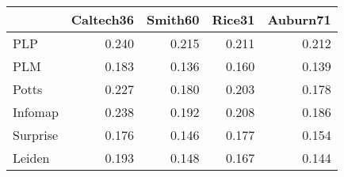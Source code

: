 \begin{tabular}{lrrrr}
\toprule
{} & Caltech36 & Smith60 & Rice31 & Auburn71 \\
\midrule
PLP      &     0.240 &   0.215 &  0.211 &    0.212 \\
PLM      &     0.183 &   0.136 &  0.160 &    0.139 \\
Potts    &     0.227 &   0.180 &  0.203 &    0.178 \\
Infomap  &     0.238 &   0.192 &  0.208 &    0.186 \\
Surprise &     0.176 &   0.146 &  0.177 &    0.154 \\
Leiden   &     0.193 &   0.148 &  0.167 &    0.144 \\
\bottomrule
\end{tabular}
